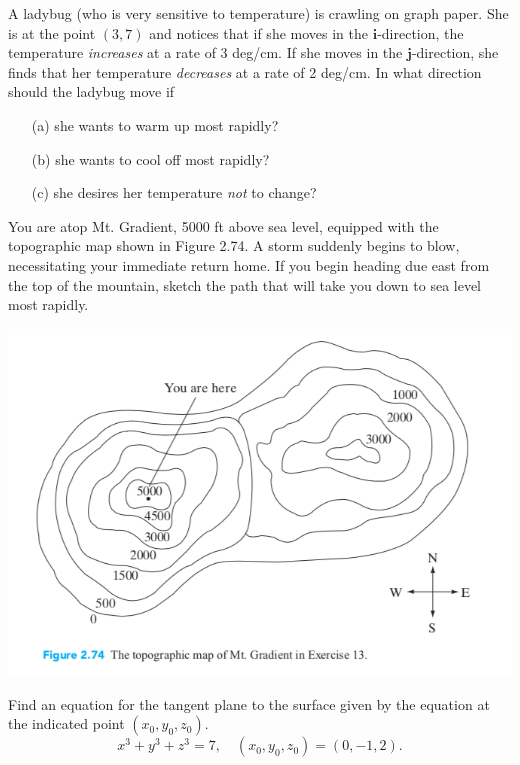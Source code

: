 \documentclass[11pt,letterpaper,boxed]{hmcpset}
\begin{document}
\begin{problem}[Colley 2.6 \#12]
A ladybug (who is very sensitive to temperature) is crawling on graph paper. 
She is at the point $(3, 7)$ and notices that if she moves in the $\mathbf{i}$-direction, the temperature 
\textit{increases} at a rate of 3 deg/cm. If she moves in the $\mathbf{j}$-direction, she finds that her temperature \textit{decreases}
at a rate of 2 deg/cm. In what direction should the ladybug move if
\begin{enumerate}
\item[(a)] she wants to warm up most rapidly?
\item[(b)] she wants to cool off most rapidly?
\item[(c)] she desires her temperature \textit{not} to change?
\end{enumerate}
\end{problem}

\begin{solution}
\vfill
\end{solution}
\newpage

\begin{problem}[Colley 2.6 \#13]
You are atop Mt. Gradient, 5000 ft above sea level, equipped with the topographic map shown in Figure 2.74. 
A storm suddenly begins to blow, necessitating your immediate return home. If you begin heading due east from 
the top of the mountain, sketch the path that will take you down to sea level most rapidly.
\begin{center}
\includegraphics[scale=0.45]{grad.png}
\end{center}
\end{problem}

\begin{solution}
\vfill
\end{solution}
\newpage

\begin{problem}[Colley 2.6 \#16]
Find an equation for the tangent plane to the surface given by the equation at the indicated point $(x_0,y_0,z_0)$.
\[
	x^3+y^3+z^3=7, \quad (x_0,y_0,z_0) = (0,-1,2).
\]
\end{problem}

\begin{solution}
\vfill
\end{solution}
\newpage
\end{document}
